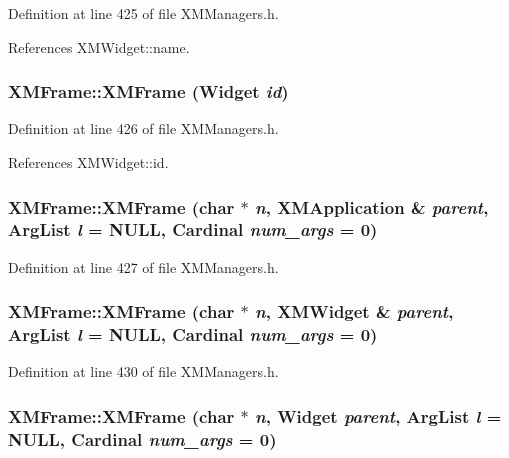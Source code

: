 Definition at line 425 of file XMManagers.h.

References XMWidget::name.
\subsubsection{\setlength{\rightskip}{0pt plus 5cm}XMFrame::XMFrame (Widget {\em id})\hspace{0.3cm}{\tt  [inline]}}\label{classXMFrame_a1}




Definition at line 426 of file XMManagers.h.

References XMWidget::id.
\subsubsection{\setlength{\rightskip}{0pt plus 5cm}XMFrame::XMFrame (char $\ast$ {\em n}, {\bf XMApplication} \& {\em parent}, Arg\-List {\em l} = NULL, Cardinal {\em num\_\-args} = 0)\hspace{0.3cm}{\tt  [inline]}}\label{classXMFrame_a2}




Definition at line 427 of file XMManagers.h.
\subsubsection{\setlength{\rightskip}{0pt plus 5cm}XMFrame::XMFrame (char $\ast$ {\em n}, {\bf XMWidget} \& {\em parent}, Arg\-List {\em l} = NULL, Cardinal {\em num\_\-args} = 0)\hspace{0.3cm}{\tt  [inline]}}\label{classXMFrame_a3}




Definition at line 430 of file XMManagers.h.
\subsubsection{\setlength{\rightskip}{0pt plus 5cm}XMFrame::XMFrame (char $\ast$ {\em n}, Widget {\em parent}, Arg\-List {\em l} = NULL, Cardinal {\em num\_\-args} = 0)\hspace{0.3cm}{\tt  [inline]}}\label{classXMFrame_a4}




